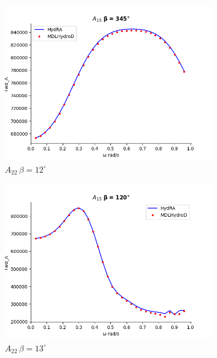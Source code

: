 \begin{figure}[H]
\begin{subfigure}[b]{0.45\textwidth}
        \includegraphics[width=\textwidth]{plots/kcs/added_mass/A15 _BETA_345.png}
        \caption{$A_{22} \, \beta = 12^{\circ}$}
    \end{subfigure}
    \begin{subfigure}[b]{0.45\textwidth}
        \includegraphics[width=\textwidth]{plots/kcs/added_mass/A15_BETA_120.png}
        \caption{$A_{22} \, \beta = 13^{\circ}$}
    \end{subfigure}
    \begin{subfigure}[b]{0.45\textwidth}

\end{subfigure}
\end{figure}
